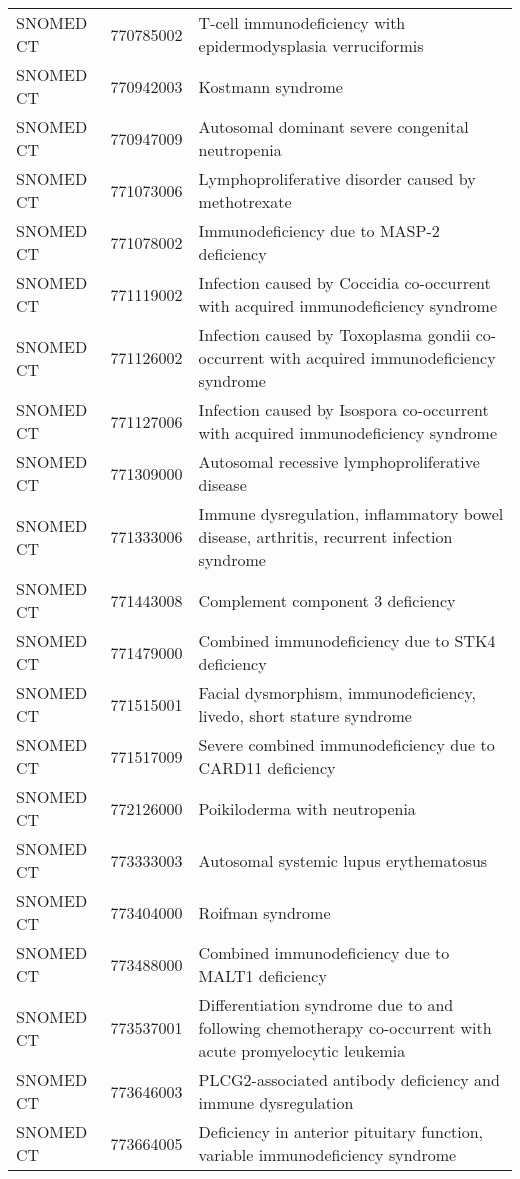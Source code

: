 \begin{longtable}{p{}p{}p{}}
  SNOMED CT & 770785002 & T-cell immunodeficiency with epidermodysplasia verruciformis \\ 
  SNOMED CT & 770942003 & Kostmann syndrome \\ 
  SNOMED CT & 770947009 & Autosomal dominant severe congenital neutropenia \\ 
  SNOMED CT & 771073006 & Lymphoproliferative disorder caused by methotrexate \\ 
  SNOMED CT & 771078002 & Immunodeficiency due to MASP-2 deficiency \\ 
  SNOMED CT & 771119002 & Infection caused by Coccidia co-occurrent with acquired immunodeficiency syndrome \\ 
  SNOMED CT & 771126002 & Infection caused by Toxoplasma gondii co-occurrent with acquired immunodeficiency syndrome \\ 
  SNOMED CT & 771127006 & Infection caused by Isospora co-occurrent with acquired immunodeficiency syndrome \\ 
  SNOMED CT & 771309000 & Autosomal recessive lymphoproliferative disease \\ 
  SNOMED CT & 771333006 & Immune dysregulation, inflammatory bowel disease, arthritis, recurrent infection syndrome \\ 
  SNOMED CT & 771443008 & Complement component 3 deficiency \\ 
  SNOMED CT & 771479000 & Combined immunodeficiency due to STK4 deficiency \\ 
  SNOMED CT & 771515001 & Facial dysmorphism, immunodeficiency, livedo, short stature syndrome \\ 
  SNOMED CT & 771517009 & Severe combined immunodeficiency due to CARD11 deficiency \\ 
  SNOMED CT & 772126000 & Poikiloderma with neutropenia \\ 
  SNOMED CT & 773333003 & Autosomal systemic lupus erythematosus \\ 
  SNOMED CT & 773404000 & Roifman syndrome \\ 
  SNOMED CT & 773488000 & Combined immunodeficiency due to MALT1 deficiency \\ 
  SNOMED CT & 773537001 & Differentiation syndrome due to and following chemotherapy co-occurrent with acute promyelocytic leukemia \\ 
  SNOMED CT & 773646003 & PLCG2-associated antibody deficiency and immune dysregulation \\ 
  SNOMED CT & 773664005 & Deficiency in anterior pituitary function, variable immunodeficiency syndrome \\ 

\end{longtable}
